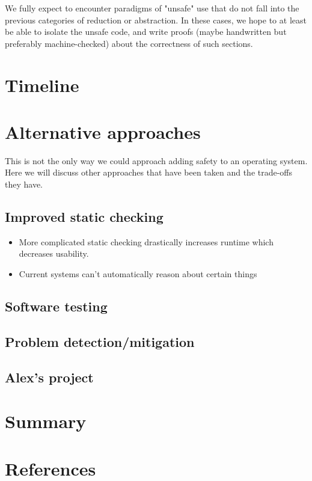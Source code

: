 \documentclass[12pt]{article}
\begin{document}
We fully expect to encounter paradigms of "unsafe" use that do not fall into the previous categories of reduction or abstraction. In these cases, we hope to at least be able to isolate the unsafe code, and write proofs (maybe handwritten but preferably machine-checked) about the correctness of such sections.



\section{Timeline}

\section{Alternative approaches}
This is not the only way we could approach adding safety to an operating system. Here we will discuss other approaches that have been taken and the trade-offs they have.

\subsection{Improved static checking}
    \begin{itemize}
        \item More complicated static checking drastically increases runtime which decreases usability.
        \item Current systems can't automatically reason about certain things
    \end{itemize}
    
\subsection{Software testing}
    
\subsection{Problem detection/mitigation}
    
\subsection{Alex's project}

\section{Summary}

\section{References}
\end{document}
